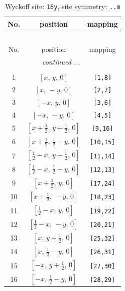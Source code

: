 \documentclass[fleqn,8pt]{jsarticle}
\begin{document}
\renewcommand{\arraystretch}{1.2}
\begin{longtable}{ccc}
\caption{Wyckoff site: {\tt 16y}, site symmetry: {\tt ..m}}
 \\
 \hline \hline
No. & position & mapping \\ \hline \endfirsthead

\multicolumn{2}{l}{\tablename\ \thetable{}} \\
 \hline \hline
No. & position & mapping \\ \hline \endhead

 \hline \hline
\multicolumn{2}{r}{\footnotesize\it continued ...} \\ \endfoot

 \hline \hline
\multicolumn{2}{r}{} \\ \endlastfoot

1 & $\left[ x,\, y,\, 0 \right]$ & {\tt [1,8]} \\ \hline
2 & $\left[ x,\, - y,\, 0 \right]$ & {\tt [2,7]} \\ \hline
3 & $\left[ - x,\, y,\, 0 \right]$ & {\tt [3,6]} \\ \hline
4 & $\left[ - x,\, - y,\, 0 \right]$ & {\tt [4,5]} \\ \hline
5 & $\left[ x + \frac{1}{2},\, y + \frac{1}{2},\, 0 \right]$ & {\tt [9,16]} \\ \hline
6 & $\left[ x + \frac{1}{2},\, \frac{1}{2} - y,\, 0 \right]$ & {\tt [10,15]} \\ \hline
7 & $\left[ \frac{1}{2} - x,\, y + \frac{1}{2},\, 0 \right]$ & {\tt [11,14]} \\ \hline
8 & $\left[ \frac{1}{2} - x,\, \frac{1}{2} - y,\, 0 \right]$ & {\tt [12,13]} \\ \hline
9 & $\left[ x + \frac{1}{2},\, y,\, 0 \right]$ & {\tt [17,24]} \\ \hline
10 & $\left[ x + \frac{1}{2},\, - y,\, 0 \right]$ & {\tt [18,23]} \\ \hline
11 & $\left[ \frac{1}{2} - x,\, y,\, 0 \right]$ & {\tt [19,22]} \\ \hline
12 & $\left[ \frac{1}{2} - x,\, - y,\, 0 \right]$ & {\tt [20,21]} \\ \hline
13 & $\left[ x,\, y + \frac{1}{2},\, 0 \right]$ & {\tt [25,32]} \\ \hline
14 & $\left[ x,\, \frac{1}{2} - y,\, 0 \right]$ & {\tt [26,31]} \\ \hline
15 & $\left[ - x,\, y + \frac{1}{2},\, 0 \right]$ & {\tt [27,30]} \\ \hline
16 & $\left[ - x,\, \frac{1}{2} - y,\, 0 \right]$ & {\tt [28,29]} \\
\end{longtable}
\end{document}
